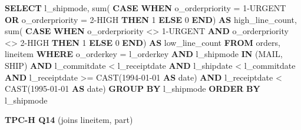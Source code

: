 \documentclass[
]{article}
\newenvironment{Shaded}{}{}
\newcommand{\ControlFlowTok}[1]{\textcolor[rgb]{0.00,0.44,0.13}{\textbf{#1}}}
\newcommand{\DataTypeTok}[1]{\textcolor[rgb]{0.56,0.13,0.00}{#1}}
\newcommand{\DecValTok}[1]{\textcolor[rgb]{0.25,0.63,0.44}{#1}}
\newcommand{\FunctionTok}[1]{\textcolor[rgb]{0.02,0.16,0.49}{#1}}
\newcommand{\KeywordTok}[1]{\textcolor[rgb]{0.00,0.44,0.13}{\textbf{#1}}}
\newcommand{\NormalTok}[1]{#1}
\newcommand{\OperatorTok}[1]{\textcolor[rgb]{0.40,0.40,0.40}{#1}}
\newcommand{\StringTok}[1]{\textcolor[rgb]{0.25,0.44,0.63}{#1}}
\begin{document}
\begin{Shaded}
\begin{Highlighting}[]
\KeywordTok{SELECT}
\NormalTok{    l\_shipmode,}
    \FunctionTok{sum}\NormalTok{(}
        \ControlFlowTok{CASE} \ControlFlowTok{WHEN}\NormalTok{ o\_orderpriority }\OperatorTok{=} \StringTok{\textquotesingle{}1{-}URGENT\textquotesingle{}}
            \KeywordTok{OR}\NormalTok{ o\_orderpriority }\OperatorTok{=} \StringTok{\textquotesingle{}2{-}HIGH\textquotesingle{}} \ControlFlowTok{THEN}
            \DecValTok{1}
        \ControlFlowTok{ELSE}
            \DecValTok{0}
        \ControlFlowTok{END}\NormalTok{) }\KeywordTok{AS}\NormalTok{ high\_line\_count,}
    \FunctionTok{sum}\NormalTok{(}
        \ControlFlowTok{CASE} \ControlFlowTok{WHEN}\NormalTok{ o\_orderpriority }\OperatorTok{\textless{}\textgreater{}} \StringTok{\textquotesingle{}1{-}URGENT\textquotesingle{}}
            \KeywordTok{AND}\NormalTok{ o\_orderpriority }\OperatorTok{\textless{}\textgreater{}} \StringTok{\textquotesingle{}2{-}HIGH\textquotesingle{}} \ControlFlowTok{THEN}
            \DecValTok{1}
        \ControlFlowTok{ELSE}
            \DecValTok{0}
        \ControlFlowTok{END}\NormalTok{) }\KeywordTok{AS}\NormalTok{ low\_line\_count}
\KeywordTok{FROM}
\NormalTok{    orders,}
\NormalTok{    lineitem}
\KeywordTok{WHERE}
\NormalTok{    o\_orderkey }\OperatorTok{=}\NormalTok{ l\_orderkey}
    \KeywordTok{AND}\NormalTok{ l\_shipmode }\KeywordTok{IN}\NormalTok{ (}\StringTok{\textquotesingle{}MAIL\textquotesingle{}}\NormalTok{, }\StringTok{\textquotesingle{}SHIP\textquotesingle{}}\NormalTok{)}
    \KeywordTok{AND}\NormalTok{ l\_commitdate }\OperatorTok{\textless{}}\NormalTok{ l\_receiptdate}
    \KeywordTok{AND}\NormalTok{ l\_shipdate }\OperatorTok{\textless{}}\NormalTok{ l\_commitdate}
    \KeywordTok{AND}\NormalTok{ l\_receiptdate }\OperatorTok{\textgreater{}=} \FunctionTok{CAST}\NormalTok{(}\StringTok{\textquotesingle{}1994{-}01{-}01\textquotesingle{}} \KeywordTok{AS} \DataTypeTok{date}\NormalTok{)}
    \KeywordTok{AND}\NormalTok{ l\_receiptdate }\OperatorTok{\textless{}} \FunctionTok{CAST}\NormalTok{(}\StringTok{\textquotesingle{}1995{-}01{-}01\textquotesingle{}} \KeywordTok{AS} \DataTypeTok{date}\NormalTok{)}
\KeywordTok{GROUP} \KeywordTok{BY}
\NormalTok{    l\_shipmode}
\KeywordTok{ORDER} \KeywordTok{BY}
\NormalTok{    l\_shipmode}
\end{Highlighting}
\end{Shaded}

\textbf{TPC-H Q14} (joins lineitem, part)
\end{document}
